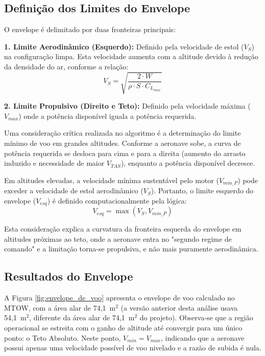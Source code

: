 \subsection{Definição dos Limites do Envelope}

O envelope é delimitado por duas fronteiras principais:

\textbf{1. Limite Aerodinâmico (Esquerdo):} Definido pela velocidade de estol ($V_S$) na configuração limpa. Esta velocidade aumenta com a altitude devido à redução da densidade do ar, conforme a relação:
\begin{equation}
    V_S = \sqrt{\frac{2 \cdot W}{\rho \cdot S \cdot C_{L_{max}}}}
\end{equation}

\textbf{2. Limite Propulsivo (Direito e Teto):} Definido pela velocidade máxima ($V_{max}$) onde a potência disponível iguala a potência requerida.

Uma consideração crítica realizada no algoritmo é a determinação do limite mínimo de voo em grandes altitudes. Conforme a aeronave sobe, a curva de potência requerida se desloca para cima e para a direita (aumento do arrasto induzido e necessidade de maior $V_{TAS}$), enquanto a potência disponível decresce.

Em altitudes elevadas, a velocidade mínima sustentável pelo motor ($V_{min\_P}$) pode exceder a velocidade de estol aerodinâmico ($V_S$). Portanto, o limite esquerdo do envelope ($V_{esq}$) é definido computacionalmente pela lógica:
\begin{equation}
    V_{esq} = \max(V_S, V_{min\_P})
\end{equation}

Esta consideração explica a curvatura da fronteira esquerda do envelope em altitudes próximas ao teto, onde a aeronave entra no "segundo regime de comando" e a limitação torna-se propulsiva, e não mais puramente aerodinâmica.

\subsection{Resultados do Envelope}

A Figura \ref{fig:envelope_de_voo} apresenta o envelope de voo calculado no MTOW, com a área alar de 74,1~m$^2$ (a versão anterior desta análise usava 54,1~m$^2$, diferente da área alar de 74,1~m$^2$ do projeto). Observa-se que a região operacional se estreita com o ganho de altitude até convergir para um único ponto: o Teto Absoluto. Neste ponto, $V_{min} = V_{max}$, indicando que a aeronave possui apenas uma velocidade possível de voo nivelado e a razão de subida é nula.

